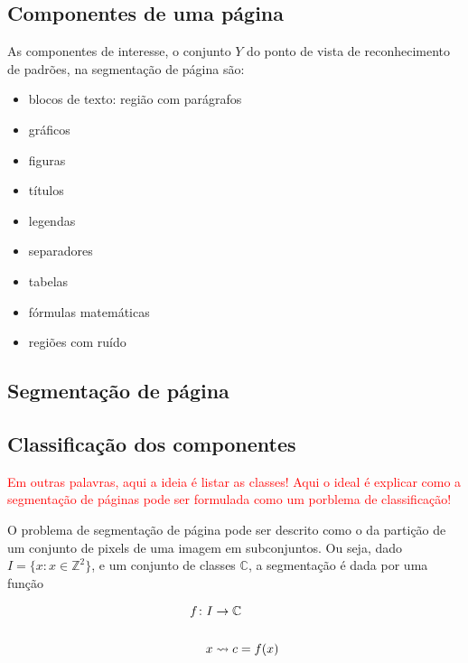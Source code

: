 \documentclass[a4paper,11pt]{article}
\newcommand{\TODO}[1]{\textcolor{red}{#1}}
\begin{document}
\subsection{Componentes de uma página}
\label{sec:components}

As componentes de interesse, o conjunto $Y$ do ponto de vista de reconhecimento de padrões, na segmentação de página são:

\begin{itemize}
  \item blocos de texto: região com parágrafos
  \item gráficos
  \item figuras
  \item títulos
  \item legendas
  \item separadores
  \item tabelas
  \item fórmulas matemáticas
  \item regiões com ruído
\end{itemize}

\subsection{Segmentação de página}

\subsection{Classificação dos componentes}

\TODO{Em outras palavras, aqui a ideia é listar as classes!}
\TODO{Aqui o ideal é explicar como a segmentação de páginas pode ser
  formulada como um porblema de classificação!}


O problema de segmentação de página pode ser descrito como o da
partição de um conjunto de pixels de uma imagem em subconjuntos. Ou
seja, dado $I = \lbrace x \colon x \in \mathbb{Z} ^ 2 \rbrace$, e um
conjunto de classes $\mathbb{C}$, a segmentação é dada por uma função

    \begin{equation}
      \begin{split}
        f \colon I &\to \mathbb{C}\\
        \cr x &\rightsquigarrow c = f(x)
      \end{split}
    \end{equation}

\end{document}
